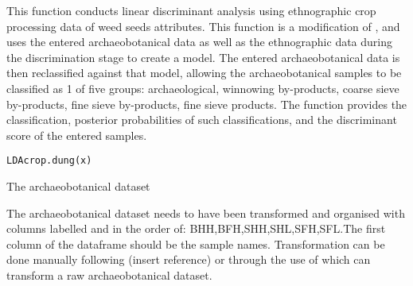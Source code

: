 \documentclass[a4paper]{book}
\begin{document}
%
\begin{Description}\relax
This function conducts linear discriminant analysis using ethnographic crop processing data of weed seeds attributes. This function is a modification of , and uses the entered archaeobotanical data as well as the ethnographic data during the discrimination stage to create a model. The entered archaeobotanical data is then reclassified against that model, allowing the archaeobotanical samples to be classified as 1 of five groups: archaeological, winnowing by-products, coarse sieve by-products, fine sieve by-products, fine sieve products. The function provides the classification, posterior probabilities of such classifications, and the discriminant score of the entered samples.
\end{Description}
%
\begin{Usage}
\begin{verbatim}
LDAcrop.dung(x)
\end{verbatim}
\end{Usage}
%
\begin{Arguments}
\begin{ldescription}
\item[\code{x}] The archaeobotanical dataset


\end{ldescription}
\end{Arguments}
%
\begin{Details}\relax
The archaeobotanical dataset needs to have been transformed and organised with columns labelled and in the order of: BHH,BFH,SHH,SHL,SFH,SFL.The first column of the dataframe should be the sample names. Transformation can be done manually following (insert reference) or through the use of  which can transform a raw archaeobotanical dataset.

\end{Details}
%
\end{document}
